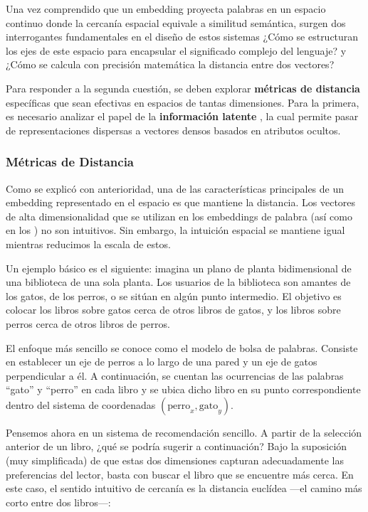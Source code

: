 Una vez comprendido que un embedding proyecta palabras en un espacio continuo donde la cercanía espacial equivale a similitud semántica, surgen dos interrogantes fundamentales en el diseño de estos sistemas ¿Cómo se estructuran los ejes de este espacio para encapsular el significado complejo del lenguaje? y ¿Cómo se calcula con precisión matemática la distancia entre dos vectores?

Para responder a la segunda cuestión, se deben explorar \textbf{métricas de distancia} específicas que sean efectivas en espacios de tantas dimensiones. Para la primera, es necesario analizar el papel de la \textbf{información latente} \cite{henner_intuitive_embeddings_2023}, la cual permite pasar de representaciones dispersas a vectores densos basados en atributos ocultos.

\subsubsection{Métricas de Distancia}

Como se explicó con anterioridad, una de las características principales de un embedding representado en el espacio es que mantiene la distancia. Los vectores de alta dimensionalidad que se utilizan en los embeddings de palabra (así como en los ) no son intuitivos. Sin embargo, la intuición espacial se mantiene igual mientras reducimos la escala de estos.

Un ejemplo básico es el siguiente: imagina un plano de planta bidimensional de una biblioteca de una sola planta. Los usuarios de la biblioteca son amantes de los gatos, de los perros, o se sitúan en algún punto intermedio. El objetivo es colocar los libros sobre gatos cerca de otros libros de gatos, y los libros sobre perros cerca de otros libros de perros.

El enfoque más sencillo se conoce como el modelo de bolsa de palabras. Consiste en establecer un eje de perros a lo largo de una pared y un eje de gatos perpendicular a él. A continuación, se cuentan las ocurrencias de las palabras ``gato'' y ``perro'' en cada libro y se ubica dicho libro en su punto correspondiente dentro del sistema de coordenadas $(\text{perro}_x, \text{gato}_y)$.

Pensemos ahora en un sistema de recomendación sencillo. A partir de la selección anterior de un libro, ¿qué se podría sugerir a continuación? Bajo la suposición (muy simplificada) de que estas dos dimensiones capturan adecuadamente las preferencias del lector, basta con buscar el libro que se encuentre más cerca. En este caso, el sentido intuitivo de cercanía es la distancia euclídea —el camino más corto entre dos libros—:

